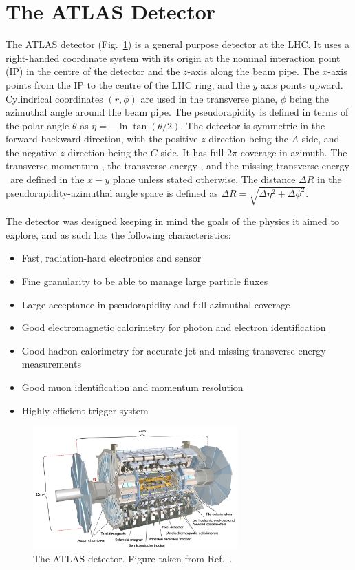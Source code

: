 \section{The ATLAS Detector}
The ATLAS detector (Fig.~\ref{fig:atlas}) is a general purpose detector at the LHC.
It uses a right-handed coordinate system with its origin at the nominal interaction point (IP) in the
 centre of the detector and the $z$-axis along the beam pipe.
The $x$-axis points from the IP to the centre of the LHC ring, and the $y$ axis points upward.
Cylindrical coordinates 
 $(r,\phi)$ are used in the transverse plane, $\phi$ being the azimuthal angle around the beam pipe.
The pseudorapidity is defined in terms of the polar angle $\theta$ as 
 $\eta=-\ln\tan(\theta/2)$.
The detector is symmetric in the forward-backward direction, with the positive $z$ direction being the $A$ side, and the negative $z$ direction being the $C$ side.
It has full $2\pi$ coverage in azimuth.
 The transverse momentum \pt, the transverse energy \Et, and the missing transverse energy \Etmiss\ are defined in the $x-y$ plane unless stated otherwise.
The distance $\Delta R$ in the pseudorapidity-azimuthal angle space is defined as $\Delta R = \sqrt{\Delta \eta^2 + \Delta \phi^2}$.

The detector was designed keeping in mind the goals of the physics it aimed to explore, and as such has the following characteristics:
\begin{itemize}
\item Fast, radiation-hard electronics and sensor
\item Fine granularity to be able to manage large particle fluxes
\item Large acceptance in pseudorapidity and full azimuthal coverage
\item Good electromagnetic calorimetry for photon and electron identification
\item Good hadron calorimetry for accurate jet and missing transverse energy measurements
\item Good muon identification and momentum resolution
\item Highly efficient trigger system 
\end{itemize}

\begin{figure}[ht]
	\centering
	\includegraphics[width=0.7\textwidth]{figures/setup/atlas.pdf}
	\caption{The ATLAS detector.
Figure taken from Ref.~\cite{Aad:2008zzm}.}	
	\label{fig:atlas}
\end{figure}


